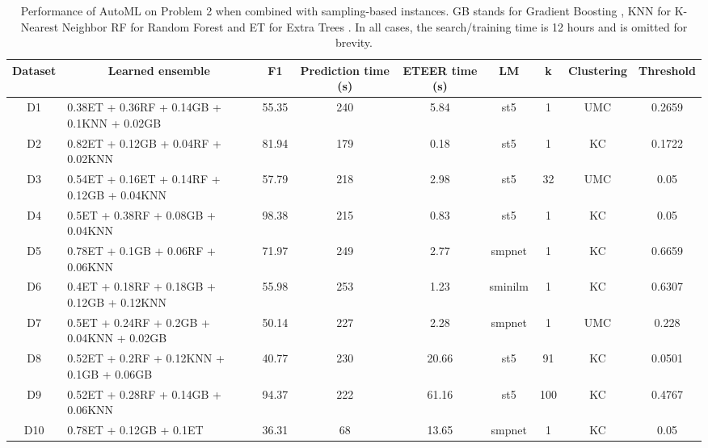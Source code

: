 \begin{table*}[t]
\begin{center}  
\footnotesize  
\setlength{\tabcolsep}{2pt}
\caption{Performance of AutoML on Problem 2 when combined with sampling-based instances. GB stands for Gradient Boosting \cite{Friedman2001GreedyFA_GB}, KNN for K-Nearest Neighbor \cite{Fix1989DiscriminatoryA_KNN} RF for Random Forest \cite{Breiman2001RandomF_RF} and ET for Extra Trees \cite{Geurts2006ExtremelyRT_ET}. In all cases, the search/training time is 12 hours and is omitted for brevity.} 
{\small
\label{tab:autosklearn-results}
\begin{tabular}{|c|l|c|c|c|c|c|c|c|}
\hline
Dataset &  \multicolumn{1}{c|}{Learned ensemble} & F1 & 
Prediction time (s)& ETEER time (s)& LM & k & Clustering & Threshold \\
\hline
\hline
D1 & 0.38ET + 0.36RF + 0.14GB + 0.1KNN + 0.02GB & 55.35 & 240 & 5.84 & st5 & 1 & UMC & 0.2659 \\
D2 & 0.82ET + 0.12GB + 0.04RF + 0.02KNN & 81.94 & 179 & 0.18 & st5 & 1 & KC & 0.1722 \\
D3 & 0.54ET + 0.16ET + 0.14RF + 0.12GB + 0.04KNN & 57.79 & 218 & 2.98 & st5 & 32 & UMC & 0.05 \\
D4 & 0.5ET + 0.38RF + 0.08GB + 0.04KNN & 98.38 & 215 & 0.83 & st5 & 1 & KC & 0.05 \\
D5 & 0.78ET + 0.1GB + 0.06RF + 0.06KNN & 71.97 & 249 & 2.77 & smpnet & 1 & KC & 0.6659 \\
D6 & 0.4ET + 0.18RF + 0.18GB + 0.12GB + 0.12KNN & 55.98 & 253 & 1.23 & sminilm & 1 & KC & 0.6307 \\
D7 & 0.5ET + 0.24RF + 0.2GB + 0.04KNN + 0.02GB & 50.14 & 227 & 2.28 & smpnet & 1 & UMC & 0.228 \\
D8 & 0.52ET + 0.2RF + 0.12KNN + 0.1GB + 0.06GB & 40.77 & 230 & 20.66 & st5 & 91 & KC & 0.0501 \\
D9 & 0.52ET + 0.28RF + 0.14GB + 0.06KNN & 94.37 & 222 & 61.16 & st5 & 100 & KC & 0.4767 \\
D10 & 0.78ET + 0.12GB + 0.1ET & 36.31 & 68 & 13.65 & smpnet & 1 & KC & 0.05 \\
\hline
\end{tabular}
}
\end{center}  
\end{table*}
